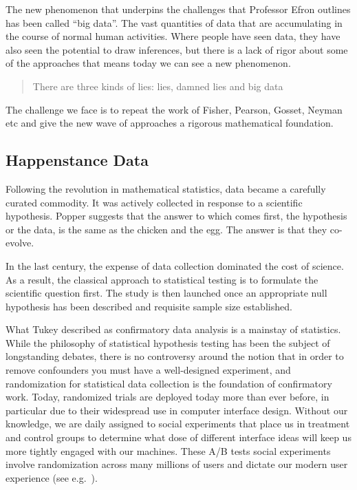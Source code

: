 \documentclass[a4paperpaper,]{article}
\begin{document}
The new phenomenon that underpins the challenges that Professor Efron
outlines has been called ``big data''. The vast quantities of data that
are accumulating in the course of normal human activities. Where people
have seen data, they have also seen the potential to draw inferences,
but there is a lack of rigor about some of the approaches that means
today we can see a new phenomenon.

\begin{quote}
There are three kinds of lies: lies, damned lies and big data
\end{quote}

The challenge we face is to repeat the work of Fisher, Pearson, Gosset,
Neyman etc and give the new wave of approaches a rigorous mathematical
foundation.

\hypertarget{happenstance-data}{%
\subsection{Happenstance Data}\label{happenstance-data}}


Following the revolution in mathematical statistics, data became a
carefully curated commodity. It was actively collected in response to a
scientific hypothesis. Popper suggests \citep{Popper:conjectures63} that
the answer to which comes first, the hypothesis or the data, is the same
as the chicken and the egg. The answer is that they co-evolve.

In the last century, the expense of data collection dominated the cost
of science. As a result, the classical approach to statistical testing
is to formulate the scientific question first. The study is then
launched once an appropriate null hypothesis has been described and
requisite sample size established.

What Tukey described as confirmatory data analysis
\citep{Tukey:exploratory77} is a mainstay of statistics. While the
philosophy of statistical hypothesis testing has been the subject of
longstanding debates, there is no controversy around the notion that in
order to remove confounders you must have a well-designed experiment,
and randomization for statistical data collection is the foundation of
confirmatory work. Today, randomized trials are deployed today more than
ever before, in particular due to their widespread use in computer
interface design. Without our knowledge, we are daily assigned to social
experiments that place us in treatment and control groups to determine
what dose of different interface ideas will keep us more tightly engaged
with our machines. These A/B tests social experiments involve
randomization across many millions of users and dictate our modern user
experience (see e.g.~\citet{Kohavi-online17}).
\end{document}
